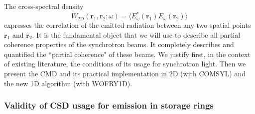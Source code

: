 \documentclass{iucr}              %
\begin{document}
The cross-spectral density
\begin{equation}
W_\text{2D}(\textbf{r}_1,\textbf{r}_2;\omega) = \big\langle E^*_{\omega}(\textbf{r}_1)  E_{\omega}(\textbf{r}_2)\big\rangle
\label{eq:CSD_2D}
\end{equation}
expresses the correlation of the emitted radiation between any two spatial points $\textbf{r}_1$ and $\textbf{r}_2$. It is the fundamental object that we will use to describe all partial coherence properties of the synchrotron beams. It completely describes and quantified the ``partial coherence" of these beams. We justify first, in the context of existing literature, the conditions of its usage for synchrotron light. Then we present the CMD and its practical implementation in 2D (with COMSYL) and the new 1D algorithm (with WOFRY1D).   


\subsubsection{Validity of CSD usage for emission in storage rings}
\end{document}
